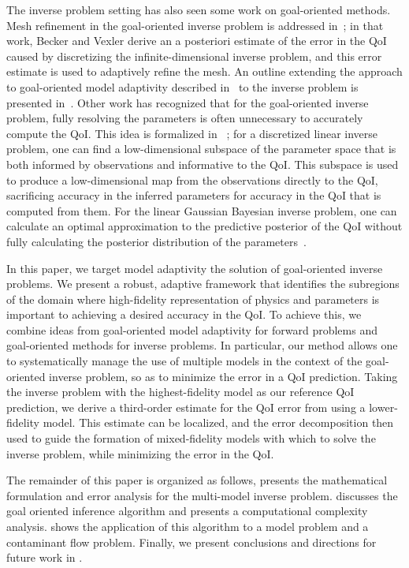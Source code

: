 The inverse problem setting has also seen some work on goal-oriented methods. Mesh refinement in the goal-oriented inverse problem is addressed in~\cite{BecVex05}; in that work, Becker and Vexler derive an a posteriori estimate of the error in the QoI caused by discretizing the infinite-dimensional inverse problem, and this error estimate is used to adaptively refine the mesh. An outline extending the approach to goal-oriented model adaptivity described in~\cite{OdenPrudetal06} to the inverse problem is presented in~\cite{OdenPrudetal10}. Other work has recognized that for the goal-oriented inverse problem, fully resolving the parameters is often unnecessary to accurately compute the QoI. This idea is formalized in ~\cite{LiebWill13}; for a discretized linear inverse problem, one can find a low-dimensional subspace of the parameter space that is both informed by observations and informative to the QoI. This subspace is used to produce a low-dimensional map from the observations directly to the QoI, sacrificing accuracy in the inferred parameters for accuracy in the QoI that is computed from them. For the linear Gaussian Bayesian inverse problem, one can calculate an optimal approximation to the predictive posterior of the QoI without fully calculating the posterior distribution of the parameters~\cite{Span16}.

In this paper, we target model adaptivity the solution of goal-oriented inverse problems. We present a robust, adaptive framework that identifies the subregions of the domain where high-fidelity representation of physics and parameters is important to achieving a desired accuracy in the QoI. To achieve this, we combine ideas from goal-oriented model adaptivity for forward problems and goal-oriented methods for inverse problems. In particular, our method allows one to systematically manage the use of multiple models in the context of the goal-oriented inverse problem, so as to minimize the error in a QoI prediction. Taking the inverse problem with the highest-fidelity model as our reference QoI prediction, we derive a third-order estimate for the QoI error from using a lower-fidelity model. This estimate can be localized, and the error decomposition then used to guide the formation of mixed-fidelity models with which to solve the inverse problem, while minimizing the error in the QoI. 

The remainder of this paper is organized as follows,  presents the mathematical formulation and error analysis for the multi-model inverse problem.  discusses the goal oriented inference algorithm and presents a computational complexity analysis.  shows the application of this algorithm to a model problem and a contaminant flow problem. Finally, we present conclusions and directions for future work in .
